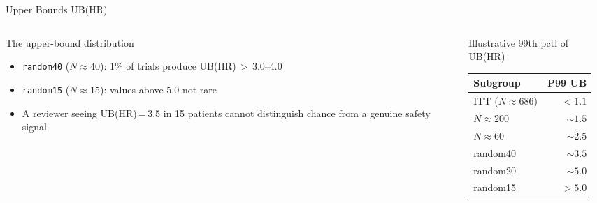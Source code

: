 \documentclass[
  11pt,
  ignorenonframetext,
  aspectratio=169,
]{beamer}
\begin{document}
\begin{frame}{Upper Bounds UB(HR)}
\label{upper-bounds-ubhr}
\begin{columns}[T]
\begin{column}{0.55\linewidth}
\begin{block}{The upper-bound distribution}
\begin{itemize}\small
\item \texttt{random40} ($N\!\approx\!40$): 1\% of trials produce UB(HR)\,$>$\,3.0--4.0
\item \texttt{random15} ($N\!\approx\!15$): values above 5.0 not rare
\item A reviewer seeing UB(HR)\,=\,3.5 in 15 patients cannot distinguish
      chance from a genuine safety signal
\end{itemize}
\end{block}
\end{column}

\begin{column}{0.42\linewidth}
\begin{exampleblock}{\footnotesize Illustrative 99th pctl of UB(HR)}
\centering\footnotesize
\begin{tabular}{lr}
\toprule
Subgroup & P99 UB \\
\midrule
ITT ($N\!\approx\!686$) & $<1.1$ \\
$N\!\approx\!200$ & $\sim\!1.5$ \\
$N\!\approx\!60$ & $\sim\!2.5$ \\
random40 & $\sim\!3.5$ \\
random20 & $\sim\!5.0$ \\
random15 & $>5.0$ \\
\bottomrule
\end{tabular}
\end{exampleblock}
\end{column}
\end{columns}
\end{frame}
\end{document}

